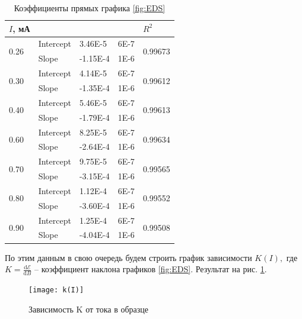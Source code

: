 \documentclass[a4paper]{article}
\begin{document}
\begin{table}
	\centering
\begin{tabular}{|l|l|l|l|l|}
	\hline
	$I$, мА               &           &          &      & $R^2$                    \\ \hline
	\multirow{2}{*}{0.26} & Intercept & 3.46E-5  & 6E-7 & \multirow{2}{*}{0.99673} \\ \cline{2-4}
	& Slope     & -1.15E-4 & 1E-6 &                          \\ \hline
	\multirow{2}{*}{0.30} & Intercept & 4.14E-5  & 6E-7 & \multirow{2}{*}{0.99612} \\ \cline{2-4}
	& Slope     & -1.35E-4 & 1E-6 &                          \\ \hline
	\multirow{2}{*}{0.40} & Intercept & 5.46E-5  & 6E-7 & \multirow{2}{*}{0.99613} \\ \cline{2-4}
	& Slope     & -1.79E-4 & 1E-6 &                          \\ \hline
	\multirow{2}{*}{0.60} & Intercept & 8.25E-5  & 6E-7 & \multirow{2}{*}{0.99634} \\ \cline{2-4}
	& Slope     & -2.64E-4 & 1E-6 &                          \\ \hline
	\multirow{2}{*}{0.70} & Intercept & 9.75E-5  & 6E-7 & \multirow{2}{*}{0.99565} \\ \cline{2-4}
	& Slope     & -3.15E-4 & 1E-6 &                          \\ \hline
	\multirow{2}{*}{0.80} & Intercept & 1.12E-4  & 6E-7 & \multirow{2}{*}{0.99552} \\ \cline{2-4}
	& Slope     & -3.60E-4 & 1E-6 &                          \\ \hline
	\multirow{2}{*}{0.90} & Intercept & 1.25E-4  & 6E-7 & \multirow{2}{*}{0.99508} \\ \cline{2-4}
	& Slope     & -4.04E-4 & 1E-6 &                          \\ \hline
\end{tabular}
	\caption{Коэффициенты прямых графика \ref{fig:EDS}}
	\label{tab:coeff}
\end{table}

По этим данным в свою очередь будем строить график зависимости $ K(I), $ где $ K = \frac{\mathrm{d} \mathscr{E}}{\mathrm{d} B} $ -- коэффициент наклона графиков \ref{fig:EDS}. Результат на рис. \ref{k}.

\begin{figure}
	\centering
	\texttt{[image: k(I)]}
	\caption{Зависимость K от тока в образце}
	\label{k}
\end{figure}
\end{document}
